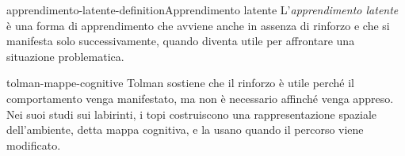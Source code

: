 \documentclass[preview]{standalone}
\begin{document}
\begin{snippetdefinition}{apprendimento-latente-definition}{Apprendimento latente}
    L'\emph{apprendimento latente} è una forma di apprendimento che avviene
    anche in assenza di rinforzo e che si manifesta solo successivamente,
    quando diventa utile per affrontare una situazione problematica.
\end{snippetdefinition}

\begin{snippet}{tolman-mappe-cognitive}
    Tolman sostiene che il rinforzo è utile perché il comportamento venga
    manifestato, ma non è necessario affinché venga appreso. Nei suoi studi sui
    labirinti, i topi costruiscono una rappresentazione spaziale dell'ambiente,
    detta mappa cognitiva, e la usano quando il percorso viene modificato.
\end{snippet}
\end{document}

